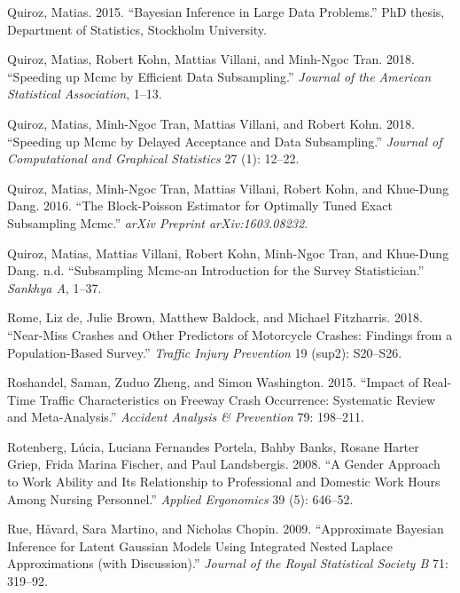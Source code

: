 \documentclass[12pt]{book}
\numberwithin{equation}{chapter}
\begin{document}
\leavevmode\hypertarget{ref-quiroz2015bayesian}{}%
Quiroz, Matias. 2015. ``Bayesian Inference in Large Data Problems.'' PhD thesis, Department of Statistics, Stockholm University.

\leavevmode\hypertarget{ref-quiroz2018speeding1}{}%
Quiroz, Matias, Robert Kohn, Mattias Villani, and Minh-Ngoc Tran. 2018. ``Speeding up Mcmc by Efficient Data Subsampling.'' \emph{Journal of the American Statistical Association}, 1--13.

\leavevmode\hypertarget{ref-quiroz2018speeding}{}%
Quiroz, Matias, Minh-Ngoc Tran, Mattias Villani, and Robert Kohn. 2018. ``Speeding up Mcmc by Delayed Acceptance and Data Subsampling.'' \emph{Journal of Computational and Graphical Statistics} 27 (1): 12--22.

\leavevmode\hypertarget{ref-quiroz2016block}{}%
Quiroz, Matias, Minh-Ngoc Tran, Mattias Villani, Robert Kohn, and Khue-Dung Dang. 2016. ``The Block-Poisson Estimator for Optimally Tuned Exact Subsampling Mcmc.'' \emph{arXiv Preprint arXiv:1603.08232}.

\leavevmode\hypertarget{ref-quirozsubsampling}{}%
Quiroz, Matias, Mattias Villani, Robert Kohn, Minh-Ngoc Tran, and Khue-Dung Dang. n.d. ``Subsampling Mcmc-an Introduction for the Survey Statistician.'' \emph{Sankhya A}, 1--37.

\leavevmode\hypertarget{ref-de2018near}{}%
Rome, Liz de, Julie Brown, Matthew Baldock, and Michael Fitzharris. 2018. ``Near-Miss Crashes and Other Predictors of Motorcycle Crashes: Findings from a Population-Based Survey.'' \emph{Traffic Injury Prevention} 19 (sup2): S20--S26.

\leavevmode\hypertarget{ref-roshandel2015impact}{}%
Roshandel, Saman, Zuduo Zheng, and Simon Washington. 2015. ``Impact of Real-Time Traffic Characteristics on Freeway Crash Occurrence: Systematic Review and Meta-Analysis.'' \emph{Accident Analysis \& Prevention} 79: 198--211.

\leavevmode\hypertarget{ref-rotenberg2008gender}{}%
Rotenberg, Lúcia, Luciana Fernandes Portela, Bahby Banks, Rosane Harter Griep, Frida Marina Fischer, and Paul Landsbergis. 2008. ``A Gender Approach to Work Ability and Its Relationship to Professional and Domestic Work Hours Among Nursing Personnel.'' \emph{Applied Ergonomics} 39 (5): 646--52.

\leavevmode\hypertarget{ref-Havard2009}{}%
Rue, Håvard, Sara Martino, and Nicholas Chopin. 2009. ``Approximate Bayesian Inference for Latent Gaussian Models Using Integrated Nested Laplace Approximations (with Discussion).'' \emph{Journal of the Royal Statistical Society B} 71: 319--92.
\end{document}
